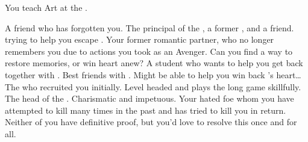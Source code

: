 \documentclass[char]{GL2020}
\begin{document}
\begin{itemz}[Notes]
	\item You teach Art at the \pSchool{}.
\end{itemz}

\begin{contacts}
	\contact{\cLibrarian{}} A friend who has forgotten you.
	\contact{\cPrincipal{}} The principal of the \pSchool{}, a former \pShippies{}, and a friend. \cPrincipal{\They} \cPrincipal{\are} trying to help you escape \cGenesis{}.
\contact{\cHeadScientist{}} Your former romantic partner, who no longer remembers you due to actions you took as an Avenger. Can you find a way to restore \cHeadScientist{\their} memories, or win \cHeadScientist{\their} heart anew?
\contact{\cInitiate{}} A \pShippies{} student who wants to help you get back together with \cHeadScientist{}.
	\contact{\cChupInventor{}} Best friends with \cHeadScientist{}. Might be able to help you win back \cHeadScientist{}’s heart\ldots
\contact{\cChupSecond{}} The \pGoaties{} who recruited you initially. Level headed and plays the long game skillfully.
	\contact{\cChupLeader{}}The head of the \pGoaties{}. Charismatic and impetuous.
	\contact{\cDiplomat{}} Your hated foe whom you have attempted to kill many times in the past and has tried to kill you in return. Neither of you have definitive proof, but you’d love to resolve this once and for all.
\end{contacts}
\end{document}

